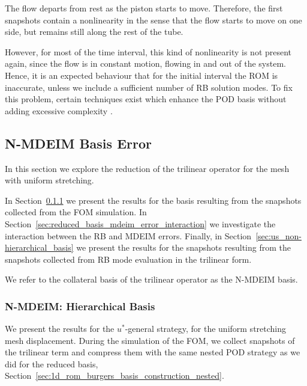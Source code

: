 \documentclass[../../thesis.tex]{subfiles}
\begin{document}
The flow departs from rest as the piston starts to move.
Therefore, the first snapshots contain a nonlinearity in the sense that the flow starts to move on one side, 
but remains still along the rest of the tube.

However, for most of the time interval, 
this kind of nonlinearity is not present again,
since the flow is in constant motion, flowing in and out of the system.
Hence, it is an expected behaviour that for the initial interval the ROM is inaccurate,
unless we include a sufficient number of RB solution modes.
To fix this problem, certain techniques exist which enhance the POD basis 
without adding excessive complexity \cite{weightedPOD}.

\subsection{N-MDEIM Basis Error}
\label{sec:uniform_mdeim_errors}
In this section we explore the reduction of the trilinear operator
for the mesh with uniform stretching.

In Section~\ref{sec:us_hierarchical_basis} we present the results for
the basis resulting from the snapshots collected from the FOM simulation.
In Section~\ref{sec:reduced_basis_mdeim_error_interaction} we investigate
the interaction between the RB and MDEIM errors.
Finally, in Section~\ref{sec:us_non-hierarchical_basis} we present the results for
the snapshots resulting from the snapshots collected from RB mode evaluation
in the trilinear form.

We refer to the collateral basis of the trilinear operator as the N-MDEIM basis.

\subsubsection{N-MDEIM: Hierarchical Basis}
\label{sec:us_hierarchical_basis}
We present the results for the \mbox{$u^{*}$-general} strategy,
for the uniform stretching mesh displacement.
During the simulation of the FOM, 
we collect snapshots of the trilinear term and compress them with the same  
nested POD strategy as we did for the reduced basis, 
Section~\ref{sec:1d_rom_burgers_basis_construction_nested}.
\end{document}
